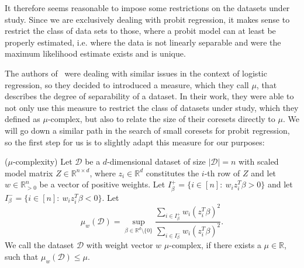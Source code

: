 It therefore seems reasonable to impose some restrictions on the
datasets under study. Since we are exclusively dealing with
probit regression, it makes sense to restrict the
class of data sets to those, where a probit model can
at least be properly estimated, i.e. where the data is not linearly separable
and were the maximum likelihood estimate exists and is unique.

The authors of~\cite{on-coresets} were dealing with similar issues in
the context of logistic regression, so they decided to introduced a
measure, which they call $\mu$, that describes the degree of separability
of a dataset.
In their work, they were able to not only use this measure to restrict
the class of datasets under study, which they defined as $\mu$-complex,
but also to relate the size of their coresets directly to $\mu$.
We will go down a similar path in the search of small coresets for probit
regression, so the first step for us is to slightly adapt this measure
for our purposes:

\begin{definition}($\mu$-complexity)
    \label{def:mu}
    Let $\mathcal{D}$ be a $d$-dimensional dataset of size
    $|\mathcal{D}|=n$ with scaled
    model matrix $Z \in \mathbb{R}^{n \times d}$, where
    $z_i \in \mathbb{R}^d$ constitutes the $i$-th
    row of $Z$ and let
    $w \in \mathbb{R}^n_{>0}$ be a vector of positive weights.
    Let $I_\beta^+ = \{i \in [n]:\ w_i z_i^T \beta > 0 \}$
    and let $I_\beta^- = \{i \in [n]:\ w_i z_i^T \beta < 0 \}$.
    Let
    \begin{equation*}
        \mu_w(\mathcal{D}) = \sup_{\beta \in \mathbb{R}^d \setminus \{0\}}
        \frac{\sum_{i \in I_\beta^+} w_i (z_i^T \beta)^2}
        {\sum_{i \in I_\beta^-} w_i (z_i^T \beta)^2}.
    \end{equation*}
    We call the dataset $\mathcal{D}$ with weight vector $w$
    $\mu$-complex, if there exists a $\mu \in \mathbb{R}$,
    such that $\mu_w(\mathcal{D}) \leq \mu$.
\end{definition}

